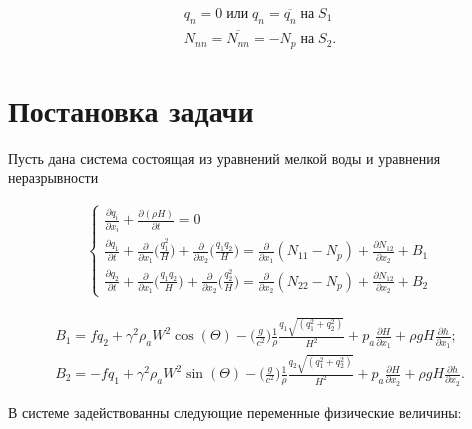 \documentclass[14pt]{extreport}
\begin{document}
\begin{eqnarray}
q_n=0 \; \text{или} \; q_n=\overline{q_n} \; \text{на} \; S_1\nonumber\\
N_{nn}=\overline{N_{nn}}=-N_p \; \text{на} \; S_2.
\end{eqnarray}

\chapter{Постановка задачи}

Пусть дана система состоящая из уравнений мелкой воды и уравнения неразрывности

\begin{eqnarray}\label{eq:task:1}
\begin{cases}
\frac{ \partial q_i}{\partial x_i} + \frac{\partial(\rho H)}{\partial t} = 0 \nonumber\\
\frac{\partial q_1}{\partial t} + \frac{\partial}{\partial x_1} \bigg(\frac{q_1^2}{H}\bigg)+\frac{\partial }{\partial x_2}\bigg(\frac{q_1 q_2}{H}\bigg) = \frac{\partial}{\partial x_1} (N_{11}-N_p) + \frac{\partial N_{12}}{\partial x_2} + B_1 \nonumber\\
\frac{\partial q_2}{\partial t} + \frac{\partial}{\partial x_1} \bigg(\frac{q_1 q_2}{H}\bigg)+\frac{\partial }{\partial x_2}\bigg(\frac{q_2^2}{H}\bigg) = \frac{\partial}{\partial x_2} (N_{22}-N_p) + \frac{\partial N_{12}}{\partial x_2} + B_2
\end{cases}
\end{eqnarray}


\begin{eqnarray}\label{eq:task:2}
B_1=fq_2+\gamma^2\rho_aW^2\cos(\Theta)-\bigg(\frac{g}{c^2}\bigg)\frac{1}{\rho}\frac{q_1\sqrt{(q_1^2+q_2^2)}}{H^2} + p_a \frac{\partial H}{\partial x_1} + \rho gH\frac{\partial h}{\partial x_1}; \\
B_2=-fq_1+\gamma^2\rho_aW^2\sin(\Theta)-\bigg(\frac{g}{c^2}\bigg)\frac{1}{\rho}\frac{q_2\sqrt{(q_1^2+q_2^2)}}{H^2} + p_a \frac{\partial H}{\partial x_2} + \rho gH\frac{\partial h}{\partial x_2}.
\end{eqnarray}

В системе задействованны следующие переменные физические величины:
\end{document}
